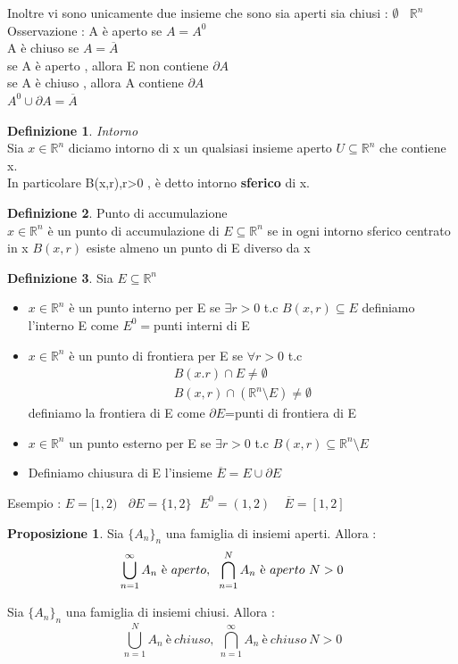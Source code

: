 \documentclass{article}
\theoremstyle{definition}
\newtheorem*{definizione}{Definizione}
\newtheorem*{proposizione}{Proposizione}
\newcommand{\R}{\mathbb{R}}
\newcommand{\Rn}{\R^n}
\begin{document}
	Inoltre vi sono unicamente due insieme che sono sia aperti sia chiusi : $\emptyset\ \ \ \  \Rn$\\
	Osservazione : A è aperto se $A=A^0$\\
	A è chiuso se $A=\overline{A}$ \\
	se A è aperto , allora E non contiene $\partial A$\\
	se A è chiuso , allora A contiene $\partial A$ \\
	$A^0 \cup \partial A = \overline{A}$
	
	\begin{definizione}
		\textit{Intorno} \\
		Sia $ x \in \Rn$ diciamo intorno di x un qualsiasi insieme aperto $U\subseteq \Rn$ che contiene x. \\In particolare B(x,r),r>0 , è detto intorno \textbf{sferico} di x. 
	\end{definizione}
	\begin{definizione}
		Punto di accumulazione \\
		$x \in \Rn$ è un punto di accumulazione di $E \subseteq \Rn$ se in ogni intorno sferico centrato in x $B(x,r)$ esiste almeno un punto di E diverso da x
	\end{definizione}
	\begin{definizione}
		Sia $E \subseteq \Rn$ 
		\begin{itemize}
			\item$x \in \Rn$ è un punto interno per E se $\exists r>0$ t.c $B(x,r) \subseteq E$ definiamo l'interno E come $E^0=${punti interni di E}
			\item $x \in \Rn$ è un punto di frontiera per E se $\forall r>0$ t.c 
			\begin{gather*}
				B(x.r)\cap E \neq \emptyset \\
				B(x,r) \cap ( \Rn \setminus E ) \neq \emptyset 
			\end{gather*}
			definiamo la frontiera di E come  $\partial E$={punti di frontiera di E}
			\item $ x \in \Rn$ un punto esterno per E se $\exists r > 0$ t.c $B(x,r) \subseteq \Rn \setminus E$
			\item Definiamo chiusura di E l'insieme $\overline{E}= E \cup \partial E $
		\end{itemize}
	\end{definizione}
	Esempio : $E=[1,2) \ \ \ \ \partial E = \{1,2\} \ \ \ E^0=(1,2) \ \ \ \ \ \overline{E}=[1,2]$
	\begin{proposizione}
		Sia $\{A_n\}_n$ una famiglia di insiemi aperti. Allora : 
		$$\bigcup_{n=1} ^{\infty} A_n \ \text{è} \ aperto , \hspace{0.2cm} \bigcap_{n=1}^N A_n\ \text{è}\ aperto \ N > 0 $$
		
		
		Sia $\{A_n\}_n$ una famiglia di insiemi chiusi. Allora : $$\bigcup_{n=1} ^{N} A_n \ \text{è} \ chiuso , \ \bigcap_{n=1}^{\infty} A_n\ \text{è} \ chiuso \ N > 0 $$
	\end{proposizione}
	
\end{document}
